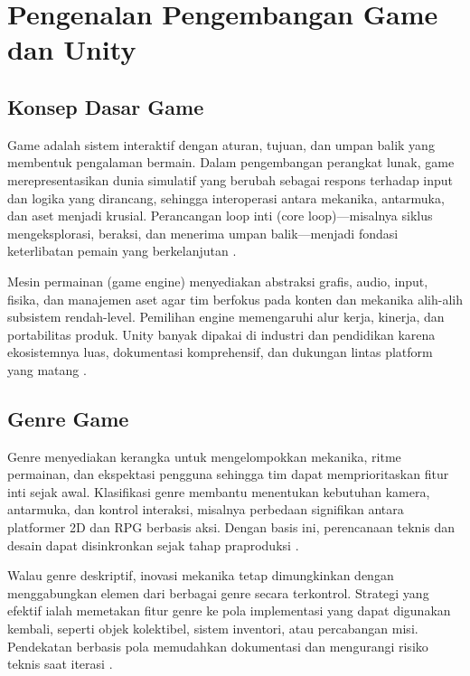 \documentclass[../main.tex]{subfiles}
\begin{document}
\chapter{Pengenalan Pengembangan Game dan Unity}

\section{Konsep Dasar Game}
Game adalah sistem interaktif dengan aturan, tujuan, dan umpan balik yang membentuk pengalaman bermain. Dalam pengembangan perangkat lunak, game merepresentasikan dunia simulatif yang berubah sebagai respons terhadap input dan logika yang dirancang, sehingga interoperasi antara mekanika, antarmuka, dan aset menjadi krusial. Perancangan loop inti (core loop)—misalnya siklus mengeksplorasi, beraksi, dan menerima umpan balik—menjadi fondasi keterlibatan pemain yang berkelanjutan \parencite{gpp-nystrom,fullerton2008game}.

Mesin permainan (game engine) menyediakan abstraksi grafis, audio, input, fisika, dan manajemen aset agar tim berfokus pada konten dan mekanika alih-alih subsistem rendah-level. Pemilihan engine memengaruhi alur kerja, kinerja, dan portabilitas produk. Unity banyak dipakai di industri dan pendidikan karena ekosistemnya luas, dokumentasi komprehensif, dan dukungan lintas platform yang matang \parencite{unity-manual-overview,unity-scripting-start-update}.

\section{Genre Game}
Genre menyediakan kerangka untuk mengelompokkan mekanika, ritme permainan, dan ekspektasi pengguna sehingga tim dapat memprioritaskan fitur inti sejak awal. Klasifikasi genre membantu menentukan kebutuhan kamera, antarmuka, dan kontrol interaksi, misalnya perbedaan signifikan antara platformer 2D dan RPG berbasis aksi. Dengan basis ini, perencanaan teknis dan desain dapat disinkronkan sejak tahap praproduksi \parencite{schell2019book}.

Walau genre deskriptif, inovasi mekanika tetap dimungkinkan dengan menggabungkan elemen dari berbagai genre secara terkontrol. Strategi yang efektif ialah memetakan fitur genre ke pola implementasi yang dapat digunakan kembali, seperti objek kolektibel, sistem inventori, atau percabangan misi. Pendekatan berbasis pola memudahkan dokumentasi dan mengurangi risiko teknis saat iterasi \parencite{gpp-nystrom,schell2019book}.
\end{document}
